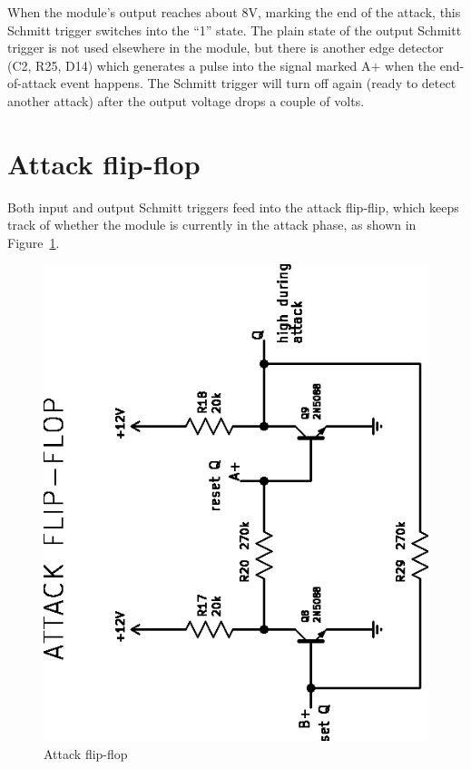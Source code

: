When the module's output reaches about 8V, marking the end of the attack,
this Schmitt trigger switches into the ``1'' state.  The plain state of the
output Schmitt trigger is not used elsewhere in the module, but there is
another edge detector (C2, R25, D14) which generates a pulse into the signal
marked A$+$ when the end-of-attack event happens.  The Schmitt trigger will
turn off again (ready to detect another attack) after the output voltage
drops a couple of volts.

\section{Attack flip-flop}

Both input and output Schmitt triggers feed into the attack flip-flip, which
keeps track of whether the module is currently in the attack phase, as shown
in Figure~\ref{fig:attack-ff}.

\begin{figure}
  \centering\includegraphics[angle=-90]{attack-ff}\par
  \caption{Attack flip-flop}
  \label{fig:attack-ff}
\end{figure}

